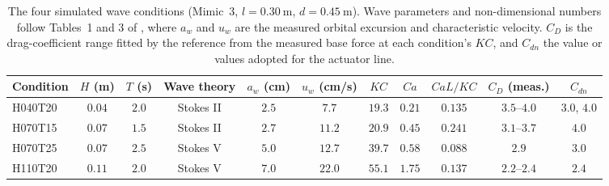 \begin{table}[!ht]
\centering
\small
\caption{The four simulated wave conditions (Mimic~3, $l = 0.30~\mathrm{m}$, $d = 0.45~\mathrm{m}$). Wave parameters and non-dimensional numbers follow Tables~1 and 3 of \citet{jacobsen_waveinduced_2019}, where $a_w$ and $u_w$ are the measured orbital excursion and characteristic velocity. $C_D$ is the drag-coefficient range fitted by the reference from the measured base force at each condition's $KC$, and $C_{dn}$ the value or values adopted for the actuator line.}
\label{tab:flexveg_conditions}
\footnotesize
\setlength{\tabcolsep}{3pt}
\renewcommand{\arraystretch}{1.15}
\begin{tabular}{l c c c c c c c c c c}
\toprule
Condition & $H$ (m) & $T$ (s) & Wave theory & $a_w$ (cm) & $u_w$ (cm/s) & $KC$ & $Ca$ & $CaL/KC$ & $C_D$ (meas.) & $C_{dn}$ \\
\midrule
H040T20 & $0.04$ & $2.0$ & Stokes II & $2.5$ & $7.7$  & $19.3$ & $0.21$ & $0.135$ & $3.5$--$4.0$ & $3.0$, $4.0$ \\
H070T15 & $0.07$ & $1.5$ & Stokes II & $2.7$ & $11.2$ & $20.9$ & $0.45$ & $0.241$ & $3.1$--$3.7$ & $4.0$ \\
H070T25 & $0.07$ & $2.5$ & Stokes V  & $5.0$ & $12.7$ & $39.7$ & $0.58$ & $0.088$ & $2.9$       & $3.0$ \\
H110T20 & $0.11$ & $2.0$ & Stokes V  & $7.0$ & $22.0$ & $55.1$ & $1.75$ & $0.137$ & $2.2$--$2.4$ & $2.4$ \\
\bottomrule
\end{tabular}
\end{table}

